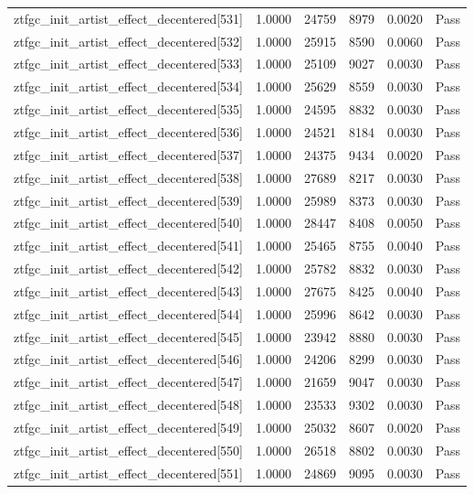 \begin{table}[htbp]
\begin{tabular}{llrrll}
ztfgc\_init\_artist\_effect\_decentered[531] & 1.0000 & 24759 & 8979 & 0.0020 & Pass \\
ztfgc\_init\_artist\_effect\_decentered[532] & 1.0000 & 25915 & 8590 & 0.0060 & Pass \\
ztfgc\_init\_artist\_effect\_decentered[533] & 1.0000 & 25109 & 9027 & 0.0030 & Pass \\
ztfgc\_init\_artist\_effect\_decentered[534] & 1.0000 & 25629 & 8559 & 0.0030 & Pass \\
ztfgc\_init\_artist\_effect\_decentered[535] & 1.0000 & 24595 & 8832 & 0.0030 & Pass \\
ztfgc\_init\_artist\_effect\_decentered[536] & 1.0000 & 24521 & 8184 & 0.0030 & Pass \\
ztfgc\_init\_artist\_effect\_decentered[537] & 1.0000 & 24375 & 9434 & 0.0020 & Pass \\
ztfgc\_init\_artist\_effect\_decentered[538] & 1.0000 & 27689 & 8217 & 0.0030 & Pass \\
ztfgc\_init\_artist\_effect\_decentered[539] & 1.0000 & 25989 & 8373 & 0.0030 & Pass \\
ztfgc\_init\_artist\_effect\_decentered[540] & 1.0000 & 28447 & 8408 & 0.0050 & Pass \\
ztfgc\_init\_artist\_effect\_decentered[541] & 1.0000 & 25465 & 8755 & 0.0040 & Pass \\
ztfgc\_init\_artist\_effect\_decentered[542] & 1.0000 & 25782 & 8832 & 0.0030 & Pass \\
ztfgc\_init\_artist\_effect\_decentered[543] & 1.0000 & 27675 & 8425 & 0.0040 & Pass \\
ztfgc\_init\_artist\_effect\_decentered[544] & 1.0000 & 25996 & 8642 & 0.0030 & Pass \\
ztfgc\_init\_artist\_effect\_decentered[545] & 1.0000 & 23942 & 8880 & 0.0030 & Pass \\
ztfgc\_init\_artist\_effect\_decentered[546] & 1.0000 & 24206 & 8299 & 0.0030 & Pass \\
ztfgc\_init\_artist\_effect\_decentered[547] & 1.0000 & 21659 & 9047 & 0.0030 & Pass \\
ztfgc\_init\_artist\_effect\_decentered[548] & 1.0000 & 23533 & 9302 & 0.0030 & Pass \\
ztfgc\_init\_artist\_effect\_decentered[549] & 1.0000 & 25032 & 8607 & 0.0020 & Pass \\
ztfgc\_init\_artist\_effect\_decentered[550] & 1.0000 & 26518 & 8802 & 0.0030 & Pass \\
ztfgc\_init\_artist\_effect\_decentered[551] & 1.0000 & 24869 & 9095 & 0.0030 & Pass \\

\end{tabular}
\end{table}
